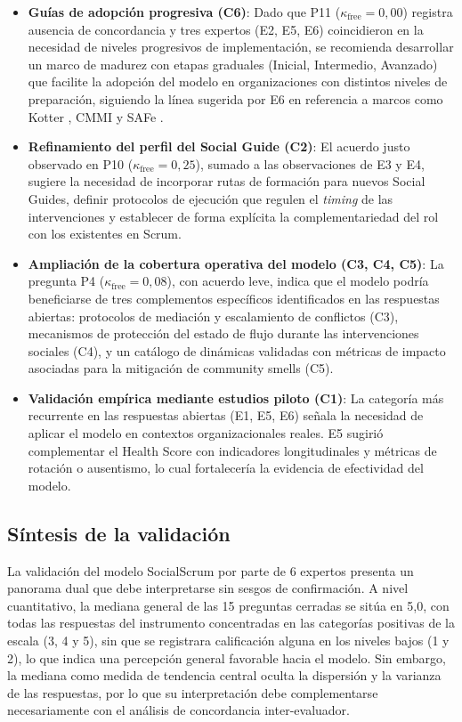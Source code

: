 \begin{itemize}
    \item \textbf{Guías de adopción progresiva (C6)}: Dado que P11 ($\kappa_{\text{free}} = 0{,}00$) registra ausencia de concordancia y tres expertos (E2, E5, E6) coincidieron en la necesidad de niveles progresivos de implementación, se recomienda desarrollar un marco de madurez con etapas graduales (Inicial, Intermedio, Avanzado) que facilite la adopción del modelo en organizaciones con distintos niveles de preparación, siguiendo la línea sugerida por E6 en referencia a marcos como Kotter \cite{kotter1996leading}, CMMI \cite{cmmidev13} y SAFe \cite{SafeFramework}.
    \item \textbf{Refinamiento del perfil del Social Guide (C2)}: El acuerdo justo observado en P10 ($\kappa_{\text{free}} = 0{,}25$), sumado a las observaciones de E3 y E4, sugiere la necesidad de incorporar rutas de formación para nuevos Social Guides, definir protocolos de ejecución que regulen el \textit{timing} de las intervenciones y establecer de forma explícita la complementariedad del rol con los existentes en Scrum.
    \item \textbf{Ampliación de la cobertura operativa del modelo (C3, C4, C5)}: La pregunta P4 ($\kappa_{\text{free}} = 0{,}08$), con acuerdo leve, indica que el modelo podría beneficiarse de tres complementos específicos identificados en las respuestas abiertas: protocolos de mediación y escalamiento de conflictos (C3), mecanismos de protección del estado de flujo durante las intervenciones sociales (C4), y un catálogo de dinámicas validadas con métricas de impacto asociadas para la mitigación de community smells (C5).
    \item \textbf{Validación empírica mediante estudios piloto (C1)}: La categoría más recurrente en las respuestas abiertas (E1, E5, E6) señala la necesidad de aplicar el modelo en contextos organizacionales reales. E5 sugirió complementar el Health Score con indicadores longitudinales y métricas de rotación o ausentismo, lo cual fortalecería la evidencia de efectividad del modelo.
\end{itemize}

\subsection{Síntesis de la validación}
La validación del modelo SocialScrum por parte de 6 expertos presenta un panorama dual que debe interpretarse sin sesgos de confirmación. A nivel cuantitativo, la mediana general de las 15 preguntas cerradas se sitúa en 5,0, con todas las respuestas del instrumento concentradas en las categorías positivas de la escala (3, 4 y 5), sin que se registrara calificación alguna en los niveles bajos (1 y 2), lo que indica una percepción general favorable hacia el modelo. Sin embargo, la mediana como medida de tendencia central oculta la dispersión y la varianza de las respuestas, por lo que su interpretación debe complementarse necesariamente con el análisis de concordancia inter-evaluador.

